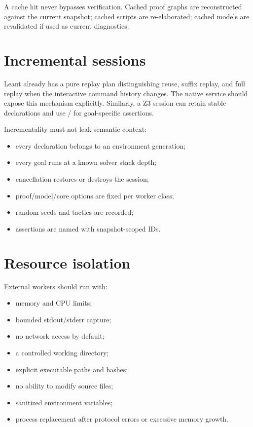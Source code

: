 \documentclass[11pt,letterpaper,openany]{report}
\newcommand{\code}[1]{\texttt{\detokenize{#1}}}
\begin{document}
A cache hit never bypasses verification. Cached proof graphs are reconstructed against
the current snapshot; cached scripts are re-elaborated; cached models are revalidated
if used as current diagnostics.

\section{Incremental sessions}

Leant already has a pure replay plan distinguishing reuse, suffix replay, and full
replay when the interactive command history changes. The native service should expose
this mechanism explicitly. Similarly, a Z3 session can retain stable declarations and
use \code{push}/\code{pop} for goal-specific assertions.

Incrementality must not leak semantic context:

\begin{itemize}
  \item every declaration belongs to an environment generation;
  \item every goal runs at a known solver stack depth;
  \item cancellation restores or destroys the session;
  \item proof/model/core options are fixed per worker class;
  \item random seeds and tactics are recorded;
  \item assertions are named with snapshot-scoped IDs.
\end{itemize}

\section{Resource isolation}

External workers should run with:

\begin{itemize}
  \item memory and CPU limits;
  \item bounded stdout/stderr capture;
  \item no network access by default;
  \item a controlled working directory;
  \item explicit executable paths and hashes;
  \item no ability to modify source files;
  \item sanitized environment variables;
  \item process replacement after protocol errors or excessive memory growth.
\end{itemize}
\end{document}
